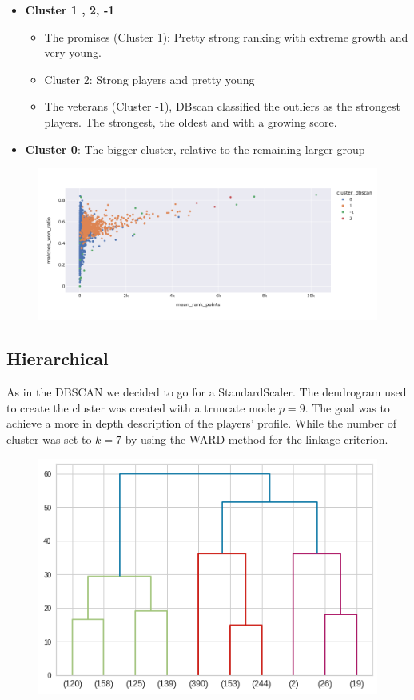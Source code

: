 \begin{itemize}
\item \textbf{Cluster 1 , 2, -1}
    \begin{itemize}
        \item The promises (Cluster 1): Pretty strong ranking with extreme growth and very young.
	    \item Cluster 2: Strong players and pretty young
	    \item The veterans (Cluster -1), DBscan classified the outliers as the strongest players. The strongest, the oldest and with a growing score.
	 \end{itemize}
\item \textbf{Cluster 0}: The bigger cluster, relative to the remaining larger group
\end{itemize}	

\begin{figure}[h]
\centering
\includegraphics[width=\textwidth]{plots/dbscan/dbscan_results}
\label{fig:dbscan_results}
\end{figure}

\subsection{Hierarchical}
As in the DBSCAN we decided to go for a StandardScaler. The dendrogram used to create the cluster was created with a truncate mode $p=9$. The goal was to achieve a more in depth description of the players' profile. While the number of cluster was set to $k=7$ by using the WARD method for the linkage criterion.

\begin{figure}[h]
\centering
\includegraphics[width=.6\textwidth]{plots/hierarchical/hierarchical_dendrogram}
\label{fig:hierarchical_dendrogram}
\end{figure}

